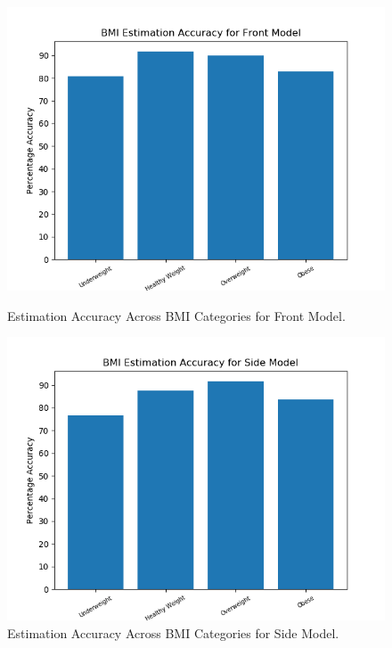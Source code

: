 \documentclass[conference]{IEEEtran}
\begin{document}
\begin{figure}[H]
    \centering
    \begin{minipage}[b]{0.35\textwidth}
    \includegraphics[width=\linewidth]{Front.png}
    \caption{Estimation Accuracy Across BMI Categories for Front Model.}
    \label{fig:frontaccuracy}
    \end{minipage}
    \hspace{1cm}
    \begin{minipage}[b]{0.35\textwidth}
    \includegraphics[width=\linewidth]{Side.png}
    \caption{Estimation Accuracy Across BMI Categories for Side Model.}
    \label{fig:sideaccuracy}
    \end{minipage}
\end{figure}
\end{document}
